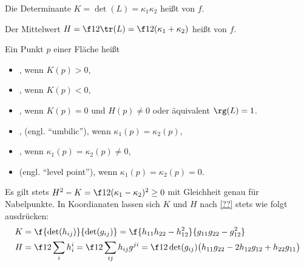\begin{df}
	Die Determinante $K = \det(L) = \kappa_1 \kappa_2$ heißt  von $f$.

	Der Mittelwert $H = \f 12 \tr(L) = \f 12 (\kappa_1 + \kappa_2)$ heißt  von $f$.

	Ein Punkt $p$ einer Fläche heißt
	\begin{itemize}
		\item
			, wenn $K(p) > 0$,
		\item
			, wenn $K(p) < 0$,
		\item
			, wenn $K(p) = 0$ und $H(p) \neq 0$ oder äquivalent $\rg(L) = 1$.
		\item
			, (engl. “umbilic”), wenn $\kappa_1(p) = \kappa_2(p)$,
		\item
			, wenn $\kappa_1(p) = \kappa_2(p) \neq 0$,
		\item
			 (engl. “level point”), wenn $\kappa_1(p) = \kappa_2(p) = 0$.
	\end{itemize}
\end{df}

\begin{kor}
	Es gilt stets $H^2 - K = \f 12 (\kappa_1 - \kappa_2)^2 \ge 0$ mit Gleichheit genau für Nabelpunkte.
	In Koordianaten lassen sich $K$ und $H$ nach \ref{??} stets wie folgt ausdrücken:
	\begin{align*}
		K &= \f{\det(h_{ij})}{\det(g_{ij})}
		= \f{h_{11}h_{22} - h_{12}^2}{g_{11}g_{22} - g_{12}^2} \\
		H &= \f 12 \sum_{i} h_{i}^i = \f 12 \sum_{ij} h_{ij} g^{ji}
		= \f 1{2\det(g_{ij})} \big( h_{11} g_{22} - 2h_{12}g_{12} + h_{22}g_{11} \big)
	\end{align*}
\end{kor}










